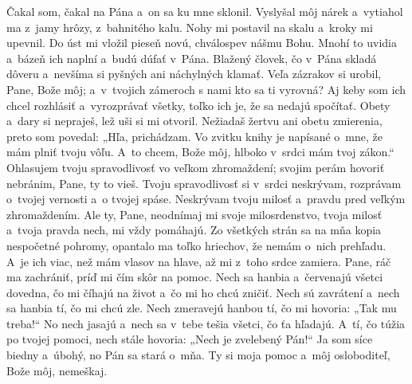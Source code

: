 Čakal som, čakal na Pána
a~on sa ku mne sklonil.
\versseparator
Vyslyšal môj nárek
a~vytiahol ma z~jamy hrôzy, z~bahnitého kalu.
\versseparator
Nohy mi postavil na skalu
a~kroky mi upevnil.
\versseparator
Do úst mi vložil pieseň novú,
chválospev nášmu Bohu.
\versseparator
Mnohí to uvidia a~bázeň ich naplní
a~budú dúfať v~Pána.
\versseparator
Blažený človek, čo v~Pána skladá dôveru
a~nevšíma si pyšných ani náchylných klamať.
\versseparator
Veľa zázrakov si urobil, Pane, Bože môj;
a~v~tvojich zámeroch s nami kto sa ti vyrovná?
\versseparator
Aj keby som ich chcel rozhlásiť a~vyrozprávať všetky,
toľko ich je, že sa nedajú spočítať.
\versseparator
Obety a~dary si nepraješ,
lež uši si mi otvoril.
\versseparator
Nežiadaš žertvu ani obetu zmierenia,
preto som povedal: „Hľa, prichádzam.
\versseparator
Vo zvitku knihy je napísané o~mne,
že mám plniť tvoju vôľu.
\versseparator
A~to chcem, Bože môj,
hlboko v~srdci mám tvoj zákon.“
\versseparator
Ohlasujem tvoju spravodlivosť vo veľkom zhromaždení;
svojim perám hovoriť nebránim, Pane, ty to vieš.
\versseparator
Tvoju spravodlivosť si v~srdci neskrývam,
rozprávam o~tvojej vernosti a~o tvojej spáse.
\versseparator
Neskrývam tvoju milosť
a~pravdu pred veľkým zhromaždením.
\versseparator
Ale ty, Pane, neodnímaj mi svoje milosrdenstvo,
tvoja milosť a~tvoja pravda nech, mi vždy pomáhajú.
\versseparator
Zo všetkých strán sa na mňa kopia
nespočetné pohromy,
\versseparator
opantalo ma toľko hriechov,
že nemám o~nich prehľadu.
\versseparator
A~je ich viac, než mám vlasov na hlave,
až mi z~toho srdce zamiera.
\versseparator
Pane, ráč ma zachrániť,
príď mi čím skôr na pomoc.
\versseparator
Nech sa hanbia a~červenajú všetci dovedna,
čo mi číhajú na život a~čo mi ho chcú zničiť.
\versseparator
Nech sú zavrátení a~nech sa hanbia tí,
čo mi chcú zle.
\versseparator
Nech zmeravejú hanbou tí,
čo mi hovoria: „Tak mu treba!“
\versseparator
No nech jasajú a~nech sa v~tebe tešia všetci, čo ťa hľadajú.
A~tí, čo túžia po tvojej pomoci,
nech stále hovoria: „Nech je zvelebený Pán!“
\versseparator
Ja som síce biedny a~úbohý,
no Pán sa stará o~mňa.
\versseparator
Ty si moja pomoc a~môj osloboditeľ,
Bože môj, nemeškaj.
